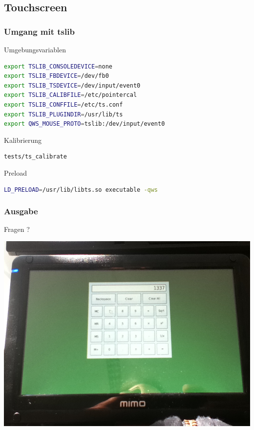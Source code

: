 \documentclass{beamer}
\begin{document}
  \subsection{Touchscreen}
	\begin{frame}
    \frametitle{Umgang mit tslib}
    \begin{block}{Umgebungsvariablen}
      \begin{lstlisting}[language=Bash]
export TSLIB_CONSOLEDEVICE=none
export TSLIB_FBDEVICE=/dev/fb0
export TSLIB_TSDEVICE=/dev/input/event0
export TSLIB_CALIBFILE=/etc/pointercal
export TSLIB_CONFFILE=/etc/ts.conf
export TSLIB_PLUGINDIR=/usr/lib/ts
export QWS_MOUSE_PROTO=tslib:/dev/input/event0
      \end{lstlisting}
    \end{block}
    \begin{block}{Kalibrierung}
      \begin{lstlisting}[language=Bash]
        tests/ts_calibrate
      \end{lstlisting}
    \end{block}
    \begin{block}{Preload}
      \begin{lstlisting}[language=Bash]
LD_PRELOAD=/usr/lib/libts.so executable -qws
      \end{lstlisting}
    \end{block}
  \end{frame}

	\begin{frame}
		\frametitle{Ausgabe}
		\begin{center}
			\Huge{Fragen ?}
		\end{center}
		\begin{center}
			\includegraphics[scale=0.2]{img/mimo_calc.jpg}
		\end{center}
	\end{frame}
\end{document}
